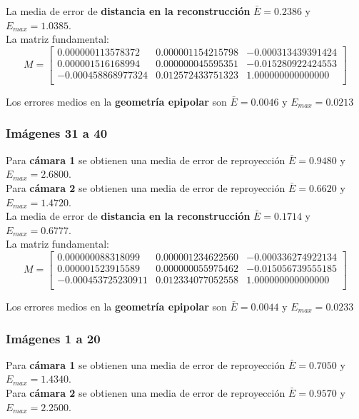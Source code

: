 \documentclass[a4paper, fontsize=11pt]{scrartcl} %
\numberwithin{equation}{section} %
\numberwithin{figure}{section} %
\numberwithin{table}{section} %
\begin{document}
	La media de error de \textbf{distancia en la reconstrucción} $\bar{E} = 0.2386$ y $E_{max} = 1.0385$.\\
	La matriz fundamental:
	\[
	M=
	\begin{bmatrix}
	0.000000113578372&	0.000001154215798&	-0.000313439391424 \\
	0.000001516168994&	0.000000045595351&	-0.015280922424553 \\
	-0.000458868977324&	0.012572433751323&	1.000000000000000  \\
	
	\end{bmatrix}
	\]
	
	Los errores medios en la \textbf{geometría epipolar} son $\bar{E} = 0.0046$ y $E_{max} = 0.0213$
	
	\subsubsection*{Imágenes 31 a 40}
	
	Para \textbf{cámara 1} se obtienen una media de error de reproyección $\bar{E} = 0.9480$ y $E_{max} = 2.6800$.\\
	Para \textbf{cámara 2} se obtienen una media de error de reproyección $\bar{E} = 0.6620$ y $E_{max} = 1.4720$.\\
	
	La media de error de \textbf{distancia en la reconstrucción} $\bar{E} = 0.1714$ y $E_{max} = 0.6777$.\\
	La matriz fundamental:
	\[
	M=
	\begin{bmatrix}
	0.000000088318099&	0.000001234622560&	-0.000336274922134 \\
	0.000001523915589&	0.000000055975462&	-0.015056739555185 \\
	-0.000453725230911&	0.012334077052558&	1.000000000000000  \\
	
	\end{bmatrix}
	\]
	
	Los errores medios en la \textbf{geometría epipolar} son $\bar{E} = 0.0044$ y $E_{max} = 0.0233$
	
	\subsubsection*{Imágenes 1 a 20}
	
	Para \textbf{cámara 1} se obtienen una media de error de reproyección $\bar{E} = 0.7050$ y $E_{max} = 1.4340$.\\
	Para \textbf{cámara 2} se obtienen una media de error de reproyección $\bar{E} = 0.9570$ y $E_{max} = 2.2500$.\\
	
\end{document}
